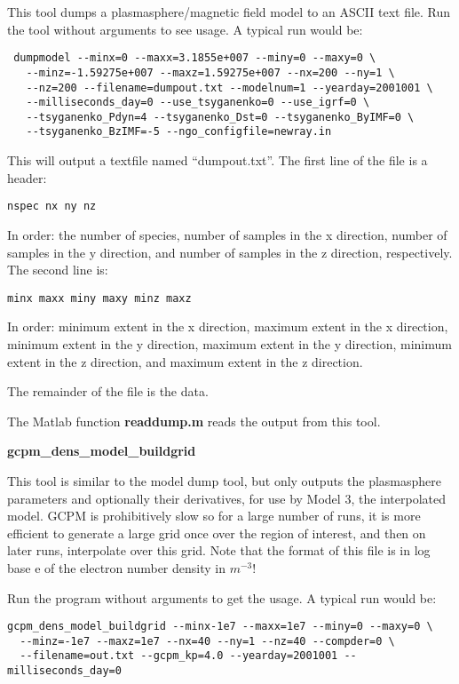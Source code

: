 \documentclass[10pt]{article}
\begin{document}
This tool dumps a plasmasphere/magnetic field model to an ASCII text
file.  Run the tool without arguments to see usage.  A typical run
would be:
\begin{verbatim}
 dumpmodel --minx=0 --maxx=3.1855e+007 --miny=0 --maxy=0 \
   --minz=-1.59275e+007 --maxz=1.59275e+007 --nx=200 --ny=1 \
   --nz=200 --filename=dumpout.txt --modelnum=1 --yearday=2001001 \
   --milliseconds_day=0 --use_tsyganenko=0 --use_igrf=0 \
   --tsyganenko_Pdyn=4 --tsyganenko_Dst=0 --tsyganenko_ByIMF=0 \
   --tsyganenko_BzIMF=-5 --ngo_configfile=newray.in
\end{verbatim}
This will output a textfile named ``dumpout.txt''.  The first line of
the file is a header:
\begin{verbatim}
nspec nx ny nz
\end{verbatim}
In order: the number of species, number of
samples in the x direction, number of samples in the y direction,
and number of samples in the z direction, respectively.  The second
line is:
\begin{verbatim}
minx maxx miny maxy minz maxz
\end{verbatim}
In order: minimum extent in the x direction, maximum extent in the x
direction, minimum extent in the y direction, maximum extent in the y
direction, minimum extent in the z direction, and maximum extent in
the z direction.

The remainder of the file is the data.

The Matlab function {\bf readdump.m} reads the output from this tool.

{\bf gcpm\_dens\_model\_buildgrid}

This tool is similar to the model dump tool, but only outputs the
plasmasphere parameters and optionally their derivatives, for use by
Model 3, the interpolated model.  GCPM is prohibitively slow so for a
large number of runs, it is more efficient to generate a large grid
once over the region of interest, and then on later runs, interpolate
over this grid.  Note that the format of this file is in log base e of
the electron number density in $m^{-3}$!

Run the program without arguments to get the usage.  A typical run
would be:
\begin{verbatim}
gcpm_dens_model_buildgrid --minx-1e7 --maxx=1e7 --miny=0 --maxy=0 \
  --minz=-1e7 --maxz=1e7 --nx=40 --ny=1 --nz=40 --compder=0 \
  --filename=out.txt --gcpm_kp=4.0 --yearday=2001001 --milliseconds_day=0
\end{verbatim}
\end{document}
